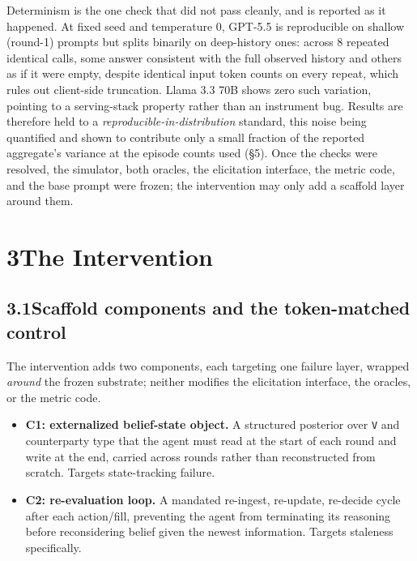 \documentclass[
  10pt,
]{article}
\providecommand{\tightlist}{%
  \setlength{\itemsep}{0pt}\setlength{\parskip}{0pt}}
\begin{document}
Determinism is the one check that did not pass cleanly, and is reported as it happened. At fixed seed and temperature 0, GPT-5.5 is reproducible on shallow (round-1) prompts but splits binarily on deep-history ones: across 8 repeated identical calls, some answer consistent with the full observed history and others as if it were empty, despite identical input token counts on every repeat, which rules out client-side truncation. Llama 3.3 70B shows zero such variation, pointing to a serving-stack property rather than an instrument bug. Results are therefore held to a \emph{reproducible-in-distribution} standard, this noise being quantified and shown to contribute only a small fraction of the reported aggregate's variance at the episode counts used (§5). Once the checks were resolved, the simulator, both oracles, the elicitation interface, the metric code, and the base prompt were frozen; the intervention may only add a scaffold layer around them.

\section{3\quad The Intervention}\label{the-intervention}

\subsection{3.1\quad Scaffold components and the token-matched control}\label{scaffold-components-and-the-token-matched-control}

The intervention adds two components, each targeting one failure layer, wrapped \emph{around} the frozen substrate; neither modifies the elicitation interface, the oracles, or the metric code.

\begin{itemize}
\tightlist
\item
  \textbf{C1: externalized belief-state object.} A structured posterior over \texttt{V} and counterparty type that the agent must read at the start of each round and write at the end, carried across rounds rather than reconstructed from scratch. Targets state-tracking failure.
\item
  \textbf{C2: re-evaluation loop.} A mandated re-ingest, re-update, re-decide cycle after each action/fill, preventing the agent from terminating its reasoning before reconsidering belief given the newest information. Targets staleness specifically.
\end{itemize}
\end{document}
